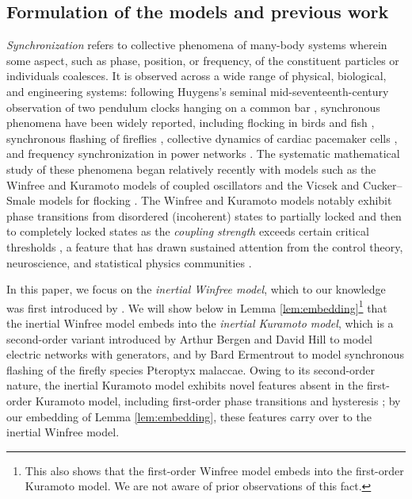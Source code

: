 \documentclass[11pt,reqno]{amsart}
\theoremstyle{definition}
\theoremstyle{remark}
\begin{document}
\subsection{Formulation of the models and previous work}
\emph{Synchronization} refers to collective phenomena of many-body systems wherein some aspect, such as phase, position, or frequency, of the constituent particles or individuals coalesces. It is observed across a wide range of physical, biological, and engineering systems: following Huygens's seminal mid-seventeenth-century observation of two pendulum clocks hanging on a common bar \cite{oliveira2015huygens}, synchronous phenomena have been widely reported, including flocking in birds and fish \cite{flierl1999individuals,vicsek1995novel}, synchronous flashing of fireflies \cite{buck1966biology}, collective dynamics of cardiac pacemaker cells \cite{peskin1975mathematical}, and frequency synchronization in power networks \cite{chiang2011direct,kundur2007power,sauer2017power}. The systematic mathematical study of these phenomena began relatively recently with models such as the Winfree \cite{winfree1967biological} and Kuramoto \cite{kuramoto1975international} models of coupled oscillators and the Vicsek and Cucker--Smale models for flocking \cite{cucker2007emergent,vicsek1995novel}. The Winfree and Kuramoto models notably exhibit phase transitions from disordered (incoherent) states to partially locked and then to completely locked states as the \emph{coupling strength} exceeds certain critical thresholds \cite{ariaratnam2001phase,crawford1994amplitude,kuramoto2002coexistence}, a feature that has drawn sustained attention from the control theory, neuroscience, and statistical physics communities \cite{acebron2005kuramoto,bernoff2011primer,dorfler2011critical,ermentrout2019recent,ha2016collective,hoppensteadt2012weakly,rodrigues2016kuramoto,strogatz2000kuramoto}.

In this paper, we focus on the \emph{inertial Winfree model}, which to our knowledge was first introduced by \cite{ha2021emergent}. We will show below in Lemma \ref{lem:embedding}\footnote{This also shows that the first-order Winfree model embeds into the first-order Kuramoto model. We are not aware of prior observations of this fact.} that the inertial Winfree model embeds into the \emph{inertial Kuramoto model}, which is a second-order variant introduced by Arthur Bergen and David Hill \cite{bergen2007structure} to model electric networks with generators, and by Bard Ermentrout \cite{ermentrout1991adaptive} to model synchronous flashing of the firefly species Pteroptyx malaccae. Owing to its second-order nature, the inertial Kuramoto model exhibits novel features absent in the first-order Kuramoto model, including first-order phase transitions \cite{tanaka1997first} and hysteresis \cite{hong1999inertia,tanaka1997self}; by our embedding of Lemma \ref{lem:embedding}, these features carry over to the inertial Winfree model.
\end{document}
